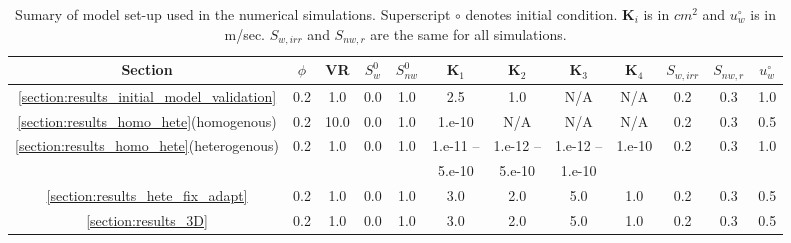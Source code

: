 \begin{landscape}
\begin{table}
  \begin{tabular}{c | c c  c  c  c  c  c  c  c  c   c}
    \hline
      {\bf Section} & $\phi$ & VR  & $S^{0}_{w}$ & $S^{0}_{nw}$ & $\mathbf{K}_{1}$ & $\mathbf{K}_{2}$ & $\mathbf{K}_{3}$ & $\mathbf{K}_{4}$ & $S_{w,irr}$ & $S_{nw,r}$ & $u^{\circ}_{w}$ \\ 
    \hline
     \ref{section:results_initial_model_validation} & 0.2 & 1.0 & 0.0 & 1.0 & 2.5 & 1.0 & N/A & N/A & 0.2 & 0.3 & 1.0 \\
     \ref{section:results_homo_hete}(homogenous)  & 0.2 & 10.0 & 0.0 & 1.0 & 1.e-10 & N/A & N/A & N/A & 0.2 & 0.3 & 0.5  \\
     \ref{section:results_homo_hete}(heterogenous) & 0.2 & 1.0 & 0.0 & 1.0 & 1.e-11 -- & 1.e-12 -- & 1.e-12 -- & 1.e-10 & 0.2  & 0.3 & 1.0 \\
      &   &  &  &  & 5.e-10 & 5.e-10 & 1.e-10  &  &  &  & \\
     \ref{section:results_hete_fix_adapt}  & 0.2 & 1.0 & 0.0 & 1.0  & 3.0 & 2.0 & 5.0 & 1.0 & 0.2 & 0.3 & 0.5  \\
     \ref{section:results_3D}  & 0.2 & 1.0 & 0.0 & 1.0 & 3.0 & 2.0 & 5.0 & 1.0 & 0.2  & 0.3 & 0.5  \\
     \hline
   \end{tabular}
   \caption{Sumary of model set-up used in the numerical simulations. Superscript $\circ$ denotes initial condition. $\mathbf{K}_{i}$ is in $cm^{2}$ and $u^{\circ}_{w}$ is in m/sec. $S_{w,irr}$ and $S_{nw,r}$ are the same for all simulations.  }
\label{table:setup}
\end{table}
\end{landscape}
\clearpage


